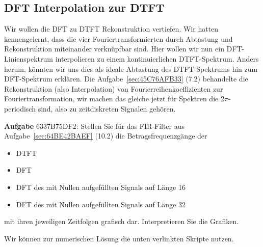 \subsection{DFT Interpolation zur DTFT}
\label{sec:6337B75DF2}
\begin{Ziel}
Wir wollen die DFT zu DTFT Rekonstruktion vertiefen. Wir hatten kennengelernt,
dass die vier Fouriertransformierten durch Abtastung und Rekonstruktion
miteinander verknüpfbar sind. Hier wollen wir nun ein DFT-Linienspektrum
interpolieren zu einem kontinuierlichen DTFT-Spektrum. Anders herum, könnten
wir uns dies als ideale Abtastung des DTFT-Spektrums hin zum DFT-Spektrum erklären.
Die Aufgabe~\ref{sec:45C76AFB33} (7.2) behandelte die Rekonstruktion (also Interpolation)
von Fourierreihenkoeffizienten zur Fouriertransformation, wir machen das gleiche
jetzt für Spektren die $2\pi$-periodisch sind, also zu zeitdiskreten Signalen
gehören.
\end{Ziel}
\textbf{Aufgabe} {\tiny 6337B75DF2}: Stellen Sie für das FIR-Filter
aus Aufgabe~\ref{sec:64BE42BAEF} (10.2) die Betragsfrequenzgänge der
\begin{itemize}
  \setlength\itemsep{-0.5em}
  \item DTFT
  \item DFT
  \item DFT des mit Nullen aufgefüllten Signals auf Länge 16
  \item DFT des mit Nullen aufgefüllten Signals auf Länge 32
\end{itemize}
mit ihren jeweiligen Zeitfolgen grafisch dar.
Interpretieren Sie die Grafiken.

Wir können zur numerischen Lösung die unten verlinkten Skripte nutzen.

